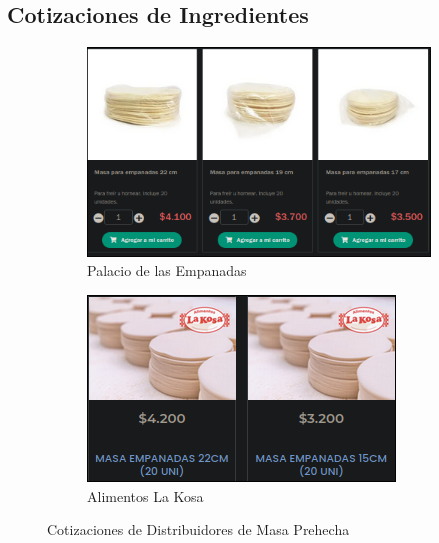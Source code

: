 \documentclass[12pt]{article}
\begin{document}
\subsection{Cotizaciones de Ingredientes}
        \begin{figure}[H] %
            \centering %
            \begin{subfigure}{0.4\textwidth}
                \centering
                \includegraphics[width=0.9\linewidth]{palaci} %
                \caption{Palacio de las Empanadas}
                \label{fig:palacio}
            \end{subfigure}
            \hfill %
            \begin{subfigure}{0.4\textwidth}
                \centering
                \includegraphics[width=0.9\linewidth]{kosa} %
                \caption{Alimentos La Kosa}
                \label{fig:kosa}
            \end{subfigure}
            \caption{Cotizaciones de Distribuidores de Masa Prehecha}
            \label{fig:cotizaciones_masas}
        \end{figure} %
\end{document}
